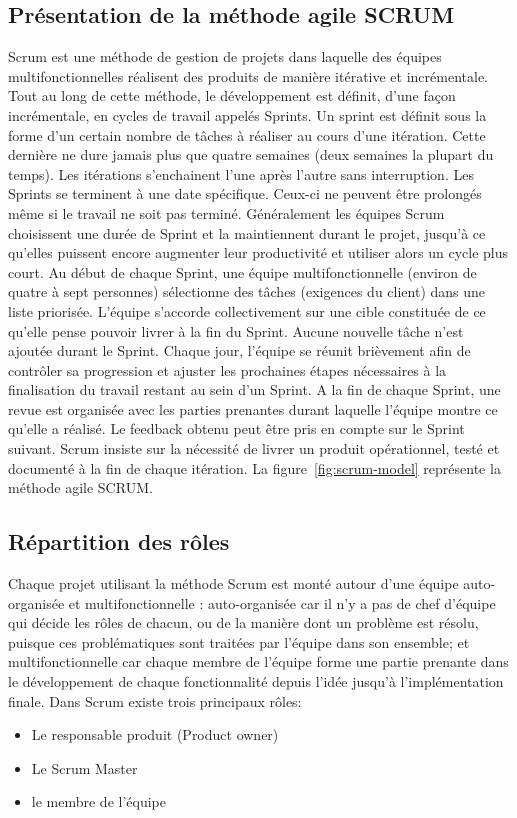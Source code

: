 \subsection{Présentation de la méthode agile SCRUM}

Scrum est une méthode de gestion de projets dans laquelle des équipes
multifonctionnelles réalisent des produits de manière itérative et incrémentale.
Tout au long de cette méthode, le développement est définit, d'une façon
incrémentale, en cycles de travail appelés Sprints. Un sprint est définit sous
la forme d'un certain nombre de tâches à réaliser au cours d'une itération.
Cette dernière ne dure jamais plus que quatre semaines (deux semaines la
plupart du temps). Les itérations s'enchainent l'une après l'autre sans
interruption. Les Sprints se terminent à une date spécifique. Ceux-ci ne
peuvent être prolongés même si le travail ne soit pas terminé. Généralement les équipes
Scrum choisissent une durée de Sprint et la maintiennent durant le projet, jusqu'à ce
qu'elles puissent encore augmenter leur productivité et utiliser alors un cycle plus court.
Au début de chaque Sprint, une équipe multifonctionnelle (environ de quatre à sept
personnes) sélectionne des tâches (exigences du client) dans une liste priorisée.
L'équipe s'accorde collectivement sur une cible constituée de ce qu'elle pense pouvoir
livrer à la fin du Sprint. Aucune nouvelle tâche n'est ajoutée durant le Sprint. Chaque
jour, l'équipe se réunit brièvement afin de contrôler sa progression et ajuster les
prochaines étapes nécessaires à la finalisation du travail restant au sein d'un Sprint. A la
fin de chaque Sprint, une revue est organisée avec les parties prenantes durant laquelle
l'équipe montre ce qu'elle a réalisé. Le feedback obtenu peut être pris en compte sur le
Sprint suivant.
Scrum insiste sur la nécessité de livrer un produit opérationnel, testé et
documenté à la fin de chaque itération.
La figure~\ref{fig:scrum-model} représente la méthode agile SCRUM. 



\subsection{Répartition des rôles}

Chaque projet utilisant la méthode Scrum est monté autour d'une équipe auto-
organisée et multifonctionnelle : auto-organisée car il n'y a pas de chef d'équipe qui
décide les rôles de chacun, ou de la manière dont un problème est résolu, puisque ces
problématiques sont traitées par l'équipe dans son ensemble; et multifonctionnelle car
chaque membre de l'équipe forme une partie prenante dans le développement de
chaque fonctionnalité depuis l'idée jusqu'à l'implémentation finale.
Dans Scrum existe trois principaux rôles:
\begin{itemize}
 \item Le responsable produit (Product owner)
 \item Le Scrum Master
 \item le membre de l'équipe
\end{itemize}

